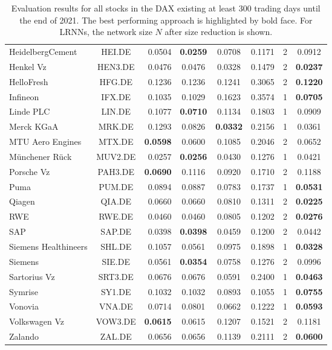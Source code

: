 \documentclass{sn-jnl}
\theoremstyle{definition}
\begin{document}
\begin{table}[b]
\begin{tabular}{l@{ }crccccc}
HeidelbergCement & HEI.DE & 0.0504 & \textbf{0.0259} & 0.0708 & 0.1171 & 2 & 0.0912\\
Henkel Vz & HEN3.DE & 0.0476 & 0.0476 & 0.0328 & 0.1479 & 2 & \textbf{0.0237}\\
HelloFresh & HFG.DE & 0.1236 & 0.1236 & 0.1241 & 0.3065 & 2 & \textbf{0.1220}\\
Infineon & IFX.DE & 0.1035 & 0.1029 & 0.1623 & 0.3574 & 1 & \textbf{0.0705}\\
Linde PLC & LIN.DE & 0.1077 & \textbf{0.0710} & 0.1134 & 0.1803 & 1 & 0.0909\\
Merck KGaA & MRK.DE & 0.1293 & 0.0826 & \textbf{0.0332} & 0.2156 & 1 & 0.0361\\
MTU Aero Engines & MTX.DE & \textbf{0.0598} & 0.0600 & 0.1085 & 0.2046 & 2 & 0.0652\\
Münchener Rück & MUV2.DE & 0.0257 & \textbf{0.0256} & 0.0430 & 0.1276 & 1 & 0.0421\\
Porsche Vz & PAH3.DE & \textbf{0.0690} & 0.1116 & 0.0920 & 0.1710 & 2 & 0.1188\\
Puma & PUM.DE & 0.0894 & 0.0887 & 0.0783 & 0.1737 & 1 & \textbf{0.0531}\\
Qiagen & QIA.DE & 0.0660 & 0.0660 & 0.0810 & 0.1311 & 2 & \textbf{0.0225}\\
RWE & RWE.DE & 0.0460 & 0.0460 & 0.0805 & 0.1202 & 2 & \textbf{0.0276}\\
SAP & SAP.DE & 0.0398 & \textbf{0.0398} & 0.0459 & 0.1200 & 2 & 0.0442\\
Siemens Healthineers & SHL.DE & 0.1057 & 0.0561 & 0.0975 & 0.1898 & 1 & \textbf{0.0328}\\
Siemens & SIE.DE & 0.0561 & \textbf{0.0354} & 0.0758 & 0.1276 & 2 & 0.0996\\
Sartorius Vz & SRT3.DE & 0.0676 & 0.0676 & 0.0591 & 0.2400 & 1 & \textbf{0.0463}\\
Symrise & SY1.DE & 0.1032 & 0.1032 & 0.0893 & 0.1055 & 1 & \textbf{0.0755}\\
Vonovia & VNA.DE & 0.0714 & 0.0801 & 0.0662 & 0.1222 & 1 & \textbf{0.0593}\\
Volkswagen Vz & VOW3.DE & \textbf{0.0615} & 0.0615 & 0.1207 & 0.1521 & 2 & 0.1181\\
Zalando & ZAL.DE & 0.0656 & 0.0656 & 0.1139 & 0.2111 & 2 & \textbf{0.0600}\\
\bottomrule
\end{tabular}
\caption{Evaluation results for all stocks in the DAX existing at least 300
trading days until the end of 2021. The best performing
approach is highlighted by bold face. For LRNNs, the network size $N$ after size
reduction is shown.}
\label{dax}
\end{table}
\end{document}
